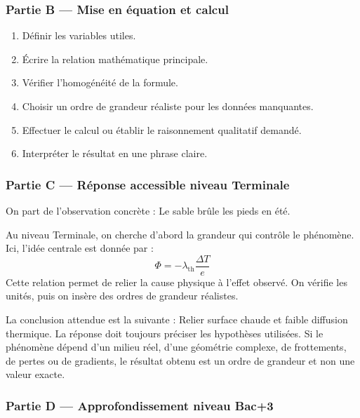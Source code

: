 \documentclass[11pt,a4paper]{article}
\begin{document}
\subsubsection*{Partie B — Mise en équation et calcul}

\begin{enumerate}
  \item Définir les variables utiles.
  \item Écrire la relation mathématique principale.
  \item Vérifier l'homogénéité de la formule.
  \item Choisir un ordre de grandeur réaliste pour les données manquantes.
  \item Effectuer le calcul ou établir le raisonnement qualitatif demandé.
  \item Interpréter le résultat en une phrase claire.
\end{enumerate}

\subsubsection*{Partie C — Réponse accessible niveau Terminale}

\begin{corrigebox}
On part de l'observation concrète : Le sable brûle les pieds en été.

Au niveau Terminale, on cherche d'abord la grandeur qui contrôle le phénomène. Ici, l'idée centrale est donnée par :
\[
\Phi=-\lambda_{\mathrm{th}}\frac{\Delta T}{e}
\]
Cette relation permet de relier la cause physique à l'effet observé. On vérifie les unités, puis on insère des ordres de grandeur réalistes.

La conclusion attendue est la suivante : Relier surface chaude et faible diffusion thermique. La réponse doit toujours préciser les hypothèses utilisées. Si le phénomène dépend d'un milieu réel, d'une géométrie complexe, de frottements, de pertes ou de gradients, le résultat obtenu est un ordre de grandeur et non une valeur exacte.
\end{corrigebox}

\subsubsection*{Partie D — Approfondissement niveau Bac+3}
\end{document}
